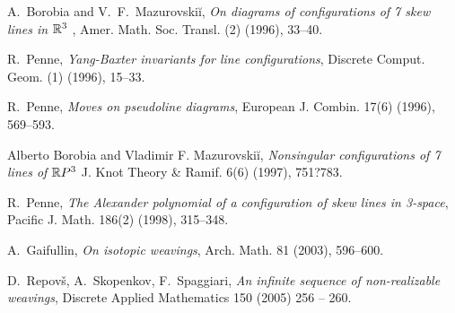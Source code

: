 \documentclass{article}
\begin{document}
\begin{thebibliography}{9999999}
A.\ Borobia and V.\ F.\ Mazurovski\u{i}, {\em On diagrams 
of configurations of 7 skew lines in $\mathbb{R}^3$ \/}, 
 Amer. Math. Soc. Transl. (2) (1996), 33--40. 

 R.\ Penne, {\em Yang-Baxter invariants for line configurations\/}, 
Discrete Comput. Geom. (1) (1996), 15--33. 

R.\ Penne, {\em Moves on pseudoline diagrams\/}, 
European J. Combin. 17(6) (1996),  569--593.

 Alberto Borobia and Vladimir F. Mazurovski\u{i}, {\em
Nonsingular configurations of 7 lines of $\mathbb{R} P^3$} J. Knot Theory \& Ramif. 6(6) (1997), 751?783. 

 R.\ Penne, {\em The Alexander polynomial of a configuration of skew lines in 3-space\/}, Pacific J. Math. 186(2) (1998), 315--348. 

 A.\ Gaifullin, {\em On isotopic weavings\/}, Arch. Math. 81 (2003), 596--600.

 D.\ Repov\v{s}, A.\ Skopenkov, F.\ Spaggiari, {\em An infinite sequence of non-realizable weavings\/},  Discrete Applied Mathematics 150 (2005) 256 -- 260. 


\end{thebibliography}
\end{document}
